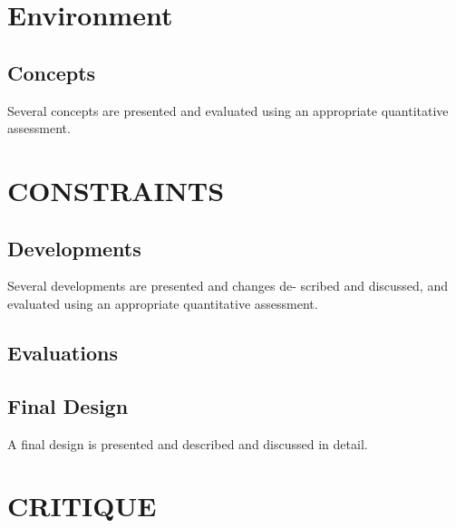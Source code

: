 \documentclass[a4paper, 10pt]{IEEEconf}
\begin{document}
\section{Environment}


\subsection{Concepts}

Several concepts are presented and evaluated using an appropriate quantitative assessment.

\section{CONSTRAINTS} 


\subsection{Developments}

Several developments are presented and changes de- scribed and discussed, and evaluated using an appropriate quantitative assessment.

\subsection{Evaluations}

\subsection{Final Design}

A final design is presented and described and discussed in detail.


\section{CRITIQUE}
\end{document}

